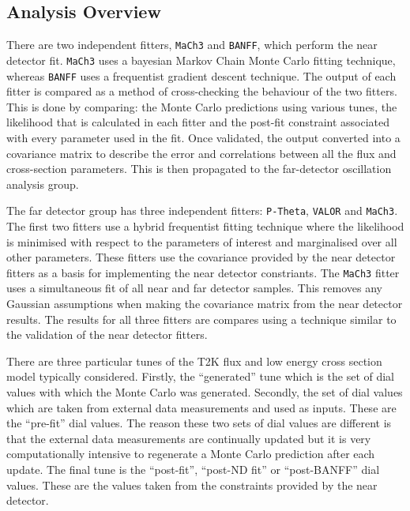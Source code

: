 \subsection{Analysis Overview}
\label{subsec:T2KSKExp_T2K_AnalysisOverview}

There are two independent fitters, \texttt{MaCh3} and \texttt{BANFF}, which perform the near detector fit. \texttt{MaCh3} uses a bayesian Markov Chain Monte Carlo fitting technique, whereas \texttt{BANFF} uses a frequentist gradient descent technique. The output of each fitter is compared as a method of cross-checking the behaviour of the two fitters. This is done by comparing: the Monte Carlo predictions using various tunes, the likelihood that is calculated in each fitter and the post-fit constraint associated with every parameter used in the fit. Once validated, the output converted into a covariance matrix to describe the error and correlations between all the flux and cross-section parameters. This is then propagated to the far-detector oscillation analysis group. 

The far detector group has three independent fitters: \texttt{P-Theta}, \texttt{VALOR} and \texttt{MaCh3}. The first two fitters use a hybrid frequentist fitting technique where the likelihood is minimised with respect to the parameters of interest and marginalised over all other parameters. These fitters use the covariance provided by the near detector fitters as a basis for implementing the near detector constriants. The \texttt{MaCh3} fitter uses a simultaneous fit of all near and far detector samples. This removes any Gaussian assumptions when making the covariance matrix from the near detector results. The results for all three fitters are compares using a technique similar to the validation of the near detector fitters.

There are three particular tunes of the T2K flux and low energy cross section model typically considered. Firstly, the ``generated'' tune which is the set of dial values with which the Monte Carlo was generated. Secondly, the set of dial values which are taken from external data measurements and used as inputs. These are the ``pre-fit'' dial values. The reason these two sets of dial values are different is that the external data measurements are continually updated but it is very computationally intensive to regenerate a Monte Carlo prediction after each update. The final tune is the ``post-fit'', ``post-ND fit'' or ``post-BANFF'' dial values. These are the values taken from the constraints provided by the near detector.

